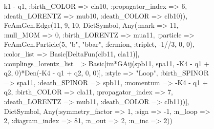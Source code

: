 \documentclass{revtex4}
\begin{document}
\begin{figure}[!htb]
\begin{center}
{k1 - q1, :birth_COLOR => cla10, :propagator_index => 6, :death_LORENTZ => mub10, :death_COLOR => clb10)), FeAmGen.Edge(11, 9, 10, Dict{Symbol, Any}(:mark => 11, :null_MOM => 0, :birth_LORENTZ => mua11, :particle => FeAmGen.Particle(5, "b", "bbar", :fermion, :triplet, -1//3, 0, 0), :color_list => Basic[DeltaFun(clb11, cla11)], :couplings_lorentz_list => Basic[im*GAij(spb11, spa11, -K4 - q1 + q2, 0)*Den(-K4 - q1 + q2, 0, 0)], :style => "Loop", :birth_SPINOR => spa11, :death_SPINOR => spb11, :momentum => -K4 - q1 + q2, :birth_COLOR => cla11, :propagator_index => 7, :death_LORENTZ => mub11, :death_COLOR => clb11))], Dict{Symbol, Any}(:symmetry_factor => 1, :sign => -1, :n_loop => 2, :diagram_index => 81, :n_out => 2, :n_inc => 2)) 
}
\end{center}
\end{figure}
\end{document}
